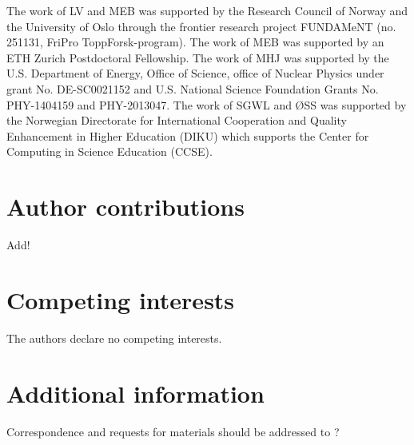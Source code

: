 \documentclass[superscriptaddress,unsortedaddress,
 amsmath,amssymb,
 aps,
]{revtex4-2}
\begin{document}


\begin{acknowledgments}

The work of LV and MEB was supported by the Research Council of Norway and the University of Oslo through the frontier research project FUNDAMeNT (no. 251131, FriPro ToppForsk-program). 
The work of MEB was supported by an ETH Zurich Postdoctoral Fellowship. 
The work of MHJ was supported by the U.S. Department of Energy,
Office of Science, office of Nuclear Physics under grant
No. DE-SC0021152 and U.S. National Science Foundation Grants
No. PHY-1404159 and PHY-2013047.
The work of SGWL and ØSS was supported by the Norwegian Directorate for International Cooperation and Quality Enhancement in Higher Education (DIKU) which supports the Center for Computing in Science Education (CCSE).


\end{acknowledgments}

\section*{Author contributions}
Add! 

\section*{Competing interests}
The authors declare no competing interests.

\section*{Additional information}
Correspondence and requests for materials should be addressed to ?
\end{document}
